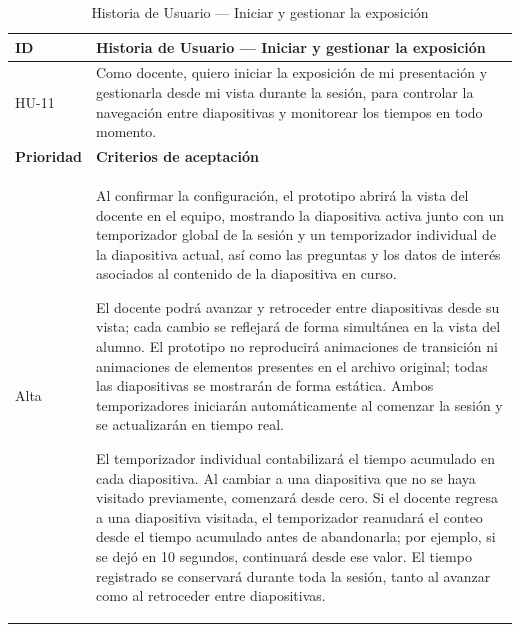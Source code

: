 \documentclass[11pt]{article}
\begin{document}
\begin{table}[H]
    \centering
    \renewcommand{\arraystretch}{1.2}
    \begin{tabular}{|p{2.5cm}|p{11cm}|}
        \hline
        \textbf{ID} & \textbf{Historia de Usuario --- Iniciar y gestionar la exposición} \\
        \hline
        HU-11 & Como docente, quiero iniciar la exposición de mi presentación y gestionarla desde mi vista durante la sesión, para controlar la navegación entre diapositivas y monitorear los tiempos en todo momento. \\
        \hline
        \textbf{Prioridad} & \textbf{Criterios de aceptación} \\
        \hline
        Alta & Al confirmar la configuración, el prototipo abrirá la vista del docente en el equipo, mostrando la diapositiva activa junto con un temporizador global de la sesión y un temporizador individual de la diapositiva actual, así como las preguntas y los datos de interés asociados al contenido de la diapositiva en curso.

        El docente podrá avanzar y retroceder entre diapositivas desde su vista; cada cambio se reflejará de forma simultánea en la vista del alumno. El prototipo no reproducirá animaciones de transición ni animaciones de elementos presentes en el archivo original; todas las diapositivas se mostrarán de forma estática. Ambos temporizadores iniciarán automáticamente al comenzar la sesión y se actualizarán en tiempo real.

        El temporizador individual contabilizará el tiempo acumulado en cada diapositiva. Al cambiar a una diapositiva que no se haya visitado previamente, comenzará desde cero. Si el docente regresa a una diapositiva visitada, el temporizador reanudará el conteo desde el tiempo acumulado antes de abandonarla; por ejemplo, si se dejó en 10 segundos, continuará desde ese valor. El tiempo registrado se conservará durante toda la sesión, tanto al avanzar como al retroceder entre diapositivas. \\
        \hline
    \end{tabular}
    \caption{Historia de Usuario --- Iniciar y gestionar la exposición}
    \label{tab:hu-iniciar-gestionar-exposicion}
\end{table}
\end{document}
